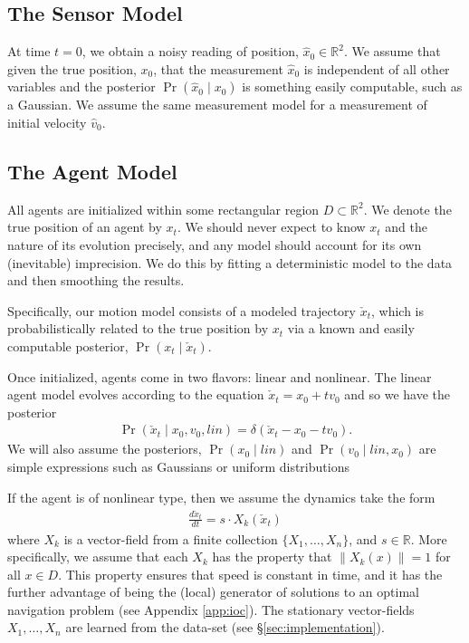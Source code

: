 \documentclass[conference]{IEEEtran}
\begin{document}
\subsection{The Sensor Model}
At time $t=0$, we obtain a noisy reading of position, $\hat{x}_0 \in \mathbb{R}^2$.
We assume that given the true position, $x_0$, that the measurement $\hat{x}_0$ is independent of all other variables and the posterior $\Pr( \hat{x}_0 \mid x_0)$
is something easily computable, such as a Gaussian.
We assume the same measurement model for a measurement of initial velocity $\hat{v}_0$.

\subsection{The Agent Model}
All agents are initialized within some rectangular region $D \subset \mathbb{R}^2$.
We denote the true position of an agent by $x_t$.
We should never expect to know $x_t$ and the nature of its evolution precisely, and any model should account for its own (inevitable) imprecision.
We do this by fitting a deterministic model to the data and then smoothing the results.

Specifically, our motion model consists of a modeled trajectory $\check{x}_t$, which is probabilistically related to the true position by $x_t$ via a known and easily computable posterior, $\Pr(x_t \mid \check{x}_t)$.

Once initialized, agents come in two flavors: linear and nonlinear.
The linear agent model evolves according to the equation $\check{x}_t = x_0 + t v_0$ and so we have the posterior
\begin{align*}
	\Pr( \check{x}_t \mid x_0, v_0, lin) = \delta( \check{x}_t - x_0 - t v_0 ).
\end{align*}
We will also assume the posteriors, $\Pr(x_0 \mid lin)$ and $\Pr( v_0 \mid lin, x_0)$ are simple expressions such as Gaussians or uniform distributions

If the agent is of nonlinear type, then we assume the dynamics take the form
\begin{align}
	\frac{d \check{x}_t}{dt} = s \cdot X_k(\check{x}_t) \label{eq:ode}
\end{align}
where $X_k$ is a vector-field from a finite collection $\{X_1, \dots, X_n\}$, and $s \in \mathbb{R}$.
More specifically, we assume that each $X_k$ has the property that $\| X_k(x) \| = 1$ for all $x \in D$.
This property ensures that speed is constant in time, and it has the further advantage of being the (local) generator
of solutions to an optimal navigation problem (see Appendix \ref{app:ioc}).
The stationary vector-fields $X_1,\dots,X_n$ are learned from the data-set (see \S \ref{sec:implementation}).
\end{document}
